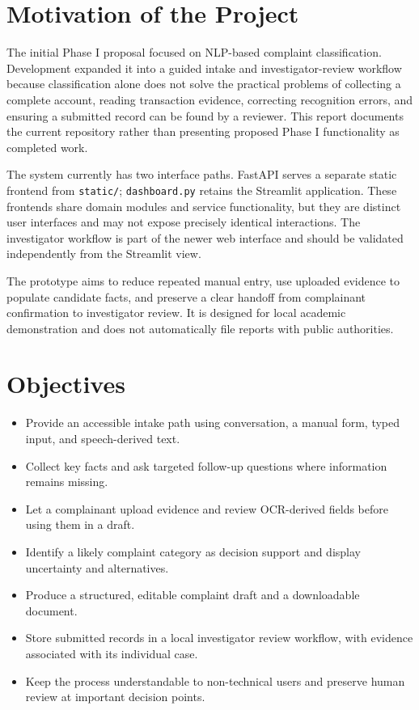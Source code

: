 \documentclass[12pt,a4paper,oneside]{report}
\begin{document}
\section{Motivation of the Project}
The initial Phase I proposal focused on NLP-based complaint classification. Development expanded it into a guided intake and investigator-review workflow because classification alone does not solve the practical problems of collecting a complete account, reading transaction evidence, correcting recognition errors, and ensuring a submitted record can be found by a reviewer. This report documents the current repository rather than presenting proposed Phase I functionality as completed work.\par\medskip
The system currently has two interface paths. FastAPI serves a separate static frontend from \texttt{static/}; \texttt{dashboard.py} retains the Streamlit application. These frontends share domain modules and service functionality, but they are distinct user interfaces and may not expose precisely identical interactions. The investigator workflow is part of the newer web interface and should be validated independently from the Streamlit view.\par\medskip
The prototype aims to reduce repeated manual entry, use uploaded evidence to populate candidate facts, and preserve a clear handoff from complainant confirmation to investigator review. It is designed for local academic demonstration and does not automatically file reports with public authorities.\par\medskip
\section{Objectives}
\begin{itemize}
\item Provide an accessible intake path using conversation, a manual form, typed input, and speech-derived text.
\item Collect key facts and ask targeted follow-up questions where information remains missing.
\item Let a complainant upload evidence and review OCR-derived fields before using them in a draft.
\item Identify a likely complaint category as decision support and display uncertainty and alternatives.
\item Produce a structured, editable complaint draft and a downloadable document.
\item Store submitted records in a local investigator review workflow, with evidence associated with its individual case.
\item Keep the process understandable to non-technical users and preserve human review at important decision points.
\end{itemize}
\end{document}
